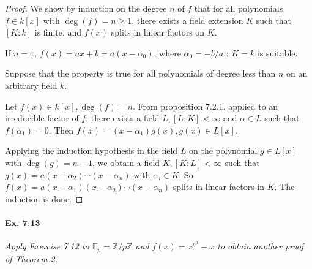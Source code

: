 \documentclass[11pt,a4paper]{article}
\newcommand{\Z}{\mathbb{Z}}
\newcommand{\F}{\mathbb{F}}
\begin{document}
\begin{proof}
We show by induction on the degree $n$ of $f$ that for all polynomials $f \in k[x]$ with $\deg(f) = n \geq 1$, there exists a field extension $K$ such that $[K:k]$ is finite, and $f(x)$ splits in linear factors on $K$.

If $n = 1$, $f(x) = ax+b = a(x-\alpha_0)$, where $\alpha_0 = -b/a$ : $K = k$ is suitable.

Suppose that the property is true for all polynomials of degree less than $n$ on an arbitrary field $k$.

Let $f(x) \in k[x], \deg(f) = n$. From proposition 7.2.1. applied to an irreducible factor of $f$, there exists a field $L, [L:K]<\infty$ and $\alpha \in L$ such that $f(\alpha_1) = 0$. Then $f(x) = (x-\alpha_1) g(x), g(x) \in L[x]$. 

Applying the induction hypothesis in the field $L$ on the polynomial $g \in L[x]$ with $\deg(g) = n-1$, we obtain a field $K, [K:L]<\infty$ such that $g(x) = a(x-\alpha_2)\cdots(x-\alpha_n)$ with $\alpha_i \in K$. So  $f(x) = a(x-\alpha_1)(x-\alpha_2)\cdots(x-\alpha_n)$ splits in linear factors in $K$. The induction is done.
\end{proof}

\paragraph{Ex. 7.13}

{\it Apply Exercise 7.12 to $\F_p = \Z/p\Z$ and $f(x) = x^{p^n} -x$ to obtain another proof of Theorem 2.
}
\end{document}
